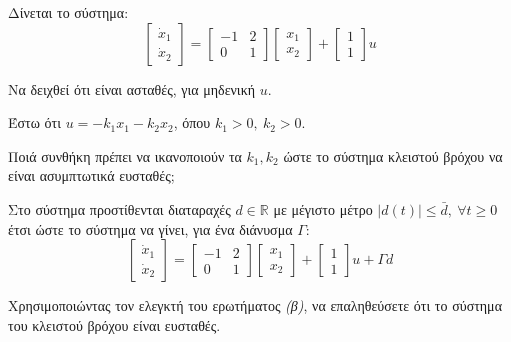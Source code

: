 \documentclass[11pt,a4paper,notitlepage,fleqn]{article}
\begin{document}
\begin{exercise}
	Δίνεται το σύστημα:
	\[
	\left[
	\begin{matrix}
	\dot x_1 \\ \dot x_2
	\end{matrix}
	\right] = \left[\begin{matrix}
	-1 & 2 \\ 0 & 1
	\end{matrix}\right]\left[\begin{matrix}
	x_1 \\ x_2
	\end{matrix}\right] + \left[\begin{matrix}
	1 \\ 1
	\end{matrix}\right]u
	\]
	
	\begin{enumgreekparen}
		\item Να δειχθεί ότι είναι ασταθές, για μηδενική \( u \).
		\item Έστω ότι \( u=-k_1x_1-k_2x_2 \), όπου \( k_1>0,\ k_2>0 \).
		
		Ποιά συνθήκη πρέπει να ικανοποιούν τα \( k_1,k_2 \) ώστε το
		σύστημα κλειστού βρόχου να είναι ασυμπτωτικά ευσταθές;
		\item Στο σύστημα προστίθενται διαταραχές
		\( d \in \mathbb R \) με μέγιστο μέτρο
		\( \left|d(t)\right| \leq \bar d ,\ \forall t \geq 0 \) έτσι
		ώστε το σύστημα να γίνει, για ένα διάνυσμα \( \Gamma \):
		\[
		\left[
		\begin{matrix}
		\dot x_1 \\ \dot x_2
		\end{matrix}
		\right] = \left[\begin{matrix}
		-1 & 2 \\ 0 & 1
		\end{matrix}\right]\left[\begin{matrix}
		x_1 \\ x_2
		\end{matrix}\right] + \left[\begin{matrix}
		1 \\ 1
		\end{matrix}\right]u + Γd
		\]
		
		Χρησιμοποιώντας τον ελεγκτή του ερωτήματος \textit{(β)}, να
		επαληθεύσετε ότι το σύστημα του κλειστού βρόχου είναι ευσταθές.
	\end{enumgreekparen}
	

\end{exercise}
\end{document}
